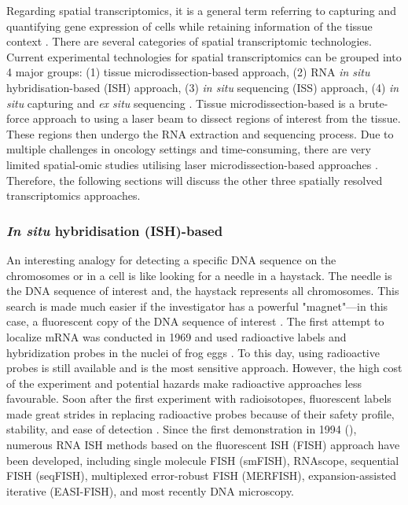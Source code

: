 Regarding spatial transcriptomics, it is a general term referring to capturing and quantifying gene expression of cells while retaining information of the tissue context \cite{burgess2019spatial}. There are several categories of spatial transcriptomic technologies. Current experimental technologies for spatial transcriptomics can be grouped into 4 major groups: (1) tissue microdissection-based approach, (2) RNA \textit{in situ} hybridisation-based (ISH) approach, (3) \textit{in situ} sequencing (ISS) approach, (4) \textit{in situ} capturing and \textit{ex situ} sequencing \cite{williams2022introduction}. Tissue microdissection-based is a brute-force approach to using a laser beam to dissect regions of interest from the tissue. These regions then undergo the RNA extraction and sequencing process. Due to multiple challenges in oncology settings and time-consuming, there are very limited spatial-omic studies utilising laser microdissection-based approaches \cite{wu2022spatial, wu2016spatially, junker2014genome}. Therefore, the following sections will discuss the other three spatially resolved transcriptomics approaches.

\subsubsection{\textit{In situ} hybridisation (ISH)-based}
\label{section:Imaging_sequecing_review}

An interesting analogy for detecting a specific DNA sequence on the chromosomes or in a cell is like looking for a needle in a haystack. The needle is the DNA sequence of interest and, the haystack represents all chromosomes. This search is made much easier if the investigator has a powerful "magnet"—in this case, a fluorescent copy of the DNA sequence of interest \cite{Connor2008natureEdu}. The first attempt to localize mRNA was conducted in 1969 and used radioactive labels and hybridization probes in the nuclei of frog eggs \cite{pardue1969molecular}. To this day, using radioactive probes is still available and is the most sensitive approach. However, the high cost of the experiment and potential hazards make radioactive approaches less favourable. Soon after the first experiment with radioisotopes, fluorescent labels made great strides in replacing radioactive probes because of their safety profile, stability, and ease of detection \cite{rudkin1977high, Connor2008natureEdu}. Since the first demonstration in 1994 (\cite{bassell1994single}), numerous RNA ISH methods based on the fluorescent ISH (FISH) approach have been developed, including single molecule FISH (smFISH), RNAscope, sequential FISH (seqFISH), multiplexed error-robust FISH (MERFISH), expansion-assisted iterative (EASI-FISH), and most recently DNA microscopy. 

